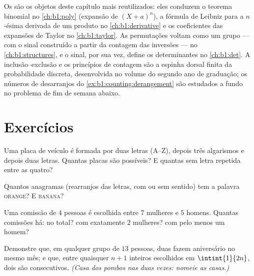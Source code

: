 \begin{remark}\label{rem:b1:counting:whereused}
Os  são os objetos deste capítulo mais reutilizados:
eles conduzem o teorema binomial no \cref{ch:b1:poly}
(expansão de $(X + a)^n$), a fórmula de Leibniz para a $n$-ésima
derivada de um produto no \cref{ch:b1:derivative} e os
coeficientes das expansões de Taylor no \cref{ch:b1:taylor}.
As permutações voltam como um grupo --- com o sinal construído a partir
da contagem das inversões --- no \cref{ch:b1:structures}, e o
sinal, por sua vez, define os determinantes no \cref{ch:b1:det}.
A inclusão--exclusão e os princípios de contagem são a espinha dorsal
finita da probabilidade discreta, desenvolvida no volume do segundo ano
de graduação; os números de desarranjos do \cref{ex:b1:counting:derangement} são
estudados a fundo no problema de fim de semana abaixo.
\end{remark}

\section{Exercícios}

\begin{exercise}[$\star$]\label{exo:b1:counting:1}
Uma placa de veículo é formada por duas letras (A--Z), depois três
algarismos e depois duas letras. Quantas placas são possíveis? E quantas
sem letra repetida entre as quatro?
\end{exercise}

\begin{exercise}[$\star$]\label{exo:b1:counting:2}
Quantos anagramas (rearranjos das letras, com ou sem sentido) tem a
palavra \textsc{orange}? E \textsc{banana}?
\end{exercise}

\begin{exercise}[$\star$]\label{exo:b1:counting:3}
Uma comissão de $4$ pessoas é escolhida entre $7$ mulheres e $5$ homens.
Quantas comissões há: no total? com exatamente $2$ mulheres? com pelo
menos um homem?
\end{exercise}

\begin{exercise}[$\star$]\label{exo:b1:counting:4}
Demonstre que, em qualquer grupo de $13$ pessoas, duas fazem aniversário
no mesmo mês; e que, entre quaisquer $n + 1$ inteiros escolhidos em
$\intint{1}{2n}$, dois são consecutivos. \emph{(Casa dos pombos nas duas
vezes: nomeie as casas.)}
\end{exercise}

